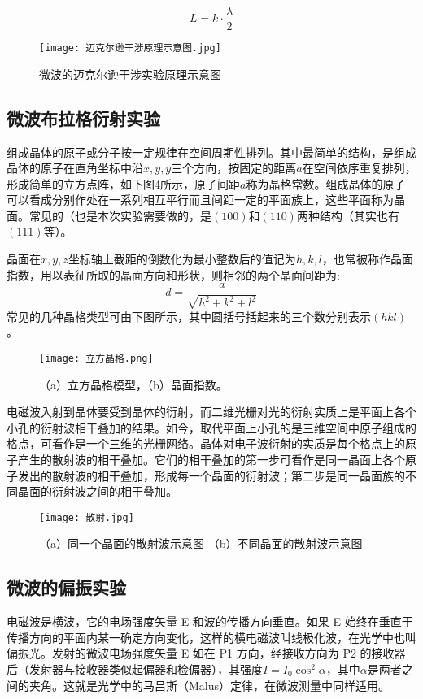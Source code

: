 \documentclass[11pt]{article}
\begin{document}
\[
L=k\cdot\frac{\lambda}{2}
\]

\begin{figure}[H]
	\centering
	\texttt{[image: 迈克尔逊干涉原理示意图.jpg]}
	\caption{微波的迈克尔逊干涉实验原理示意图}
\end{figure}

\subsection{微波布拉格衍射实验}

组成晶体的原子或分子按一定规律在空间周期性排列。其中最简单的结构，是组成晶体的原子在直角坐标中沿$x,y,y$三个方向，按固定的距离$a$在空间依序重复排列，形成简单的立方点阵，如下图4所示，原子间距$a$称为晶格常数。组成晶体的原子可以看成分别作处在一系列相互平行而且间距一定的平面族上，这些平面称为晶面。常见的（也是本次实验需要做的，是$(100)$和$(110)$两种结构（其实也有$(111)$等）。

晶面在$x,y,z$坐标轴上截距的倒数化为最小整数后的值记为$h,k,l$，也常被称作晶面指数，用以表征所取的晶面方向和形状，则相邻的两个晶面间距为:\begin{displaymath}d=\frac{a}{\sqrt{h^2+k^2+l^2}}\end{displaymath}常见的几种晶格类型可由下图所示，其中圆括号括起来的三个数分别表示$(hkl)$。
\begin{figure}[H]
	\centering
	\texttt{[image: 立方晶格.png]}
	\caption{（a）立方晶格模型，（b）晶面指数。}
\end{figure}

电磁波入射到晶体要受到晶体的衍射，而二维光栅对光的衍射实质上是平面上各个小孔的衍射波相干叠加的结果。如今，取代平面上小孔的是三维空间中原子组成的格点，可看作是一个三维的光栅网络。晶体对电子波衍射的实质是每个格点上的原子产生的散射波的相干叠加。它们的相干叠加的第一步可看作是同一晶面上各个原子发出的散射波的相干叠加，形成每一个晶面的衍射波；第二步是同一晶面族的不同晶面的衍射波之间的相干叠加。
\begin{figure}[H]
	\centering
	\texttt{[image: 散射.jpg]}
	\caption{（a）同一个晶面的散射波示意图 （b）不同晶面的散射波示意图}
\end{figure}

\subsection{微波的偏振实验}

电磁波是横波，它的电场强度矢量 E 和波的传播方向垂直。如果 E 始终在垂直于传播方向的平面内某一确定方向变化，这样的横电磁波叫线极化波，在光学中也叫偏振光。发射的微波电场强度矢量 E 如在 P1 方向，经接收方向为 P2 的接收器后（发射器与接收器类似起偏器和检偏器），其强度$I = I_0\cos^2{\alpha}$，其中$\alpha$是两者之间的夹角。这就是光学中的马吕斯（Malus）定律，在微波测量中同样适用。
\end{document}
